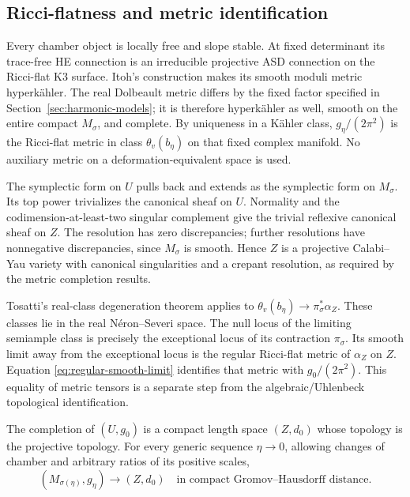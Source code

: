 \subsection{Ricci-flatness and metric identification}
Every chamber object is locally free and
slope stable. At fixed determinant its
trace-free HE connection is an irreducible
projective ASD connection on the Ricci-flat
K3 surface. Itoh's construction
\cite[Theorem~2.1]{itoh} makes its smooth
moduli metric hyperk\"ahler. The real
Dolbeault metric differs by the fixed factor
specified in Section~\ref{sec:harmonic-models};
it is therefore hyperk\"ahler as well,
smooth on the entire compact $M_\sigma$,
and complete. By uniqueness in a K\"ahler
class,
$g_\eta/(2\pi^2)$ is the Ricci-flat metric
in class $\theta_v(b_\eta)$ on that fixed
complex manifold. No auxiliary metric on
a deformation-equivalent space is used.

The symplectic form on $U$ pulls back and
extends as the symplectic form on
$M_\sigma$. Its top power trivializes the
canonical sheaf on $U$. Normality and the
codimension-at-least-two singular complement
give the trivial reflexive canonical sheaf
on $Z$. The resolution has zero discrepancies;
further resolutions have nonnegative
discrepancies, since $M_\sigma$ is smooth.
Hence $Z$ is a projective Calabi--Yau
variety with canonical singularities and
a crepant resolution, as required by the
metric completion results.

Tosatti's real-class degeneration theorem
\cite[Theorem~1.1 and the subsequent sequence
formulation]{tosatti} applies to
$\theta_v(b_\eta)\to\pi_\sigma^*\alpha_Z$.
These classes lie in the real N\'eron--Severi space.
The null locus of the limiting semiample class is precisely
the exceptional locus of its contraction $\pi_\sigma$.
Its smooth limit away from the exceptional
locus is the regular Ricci-flat metric
of $\alpha_Z$ on $Z$. Equation
\eqref{eq:regular-smooth-limit} identifies
that metric with $g_0/(2\pi^2)$.
This equality of metric tensors is a separate
step from the algebraic/Uhlenbeck topological
identification.

\begin{proposition}\label{prop:compact-limit}
The completion of $(U,g_0)$ is a compact
length space $(Z,d_0)$ whose topology is
the projective topology. For every generic
sequence $\eta\to0$, allowing changes of
chamber and arbitrary ratios of its positive
scales,
\[
 (M_{\sigma(\eta)},g_\eta)
          \longrightarrow(Z,d_0)
 \quad\text{in compact Gromov--Hausdorff distance}.
\]
\end{proposition}

